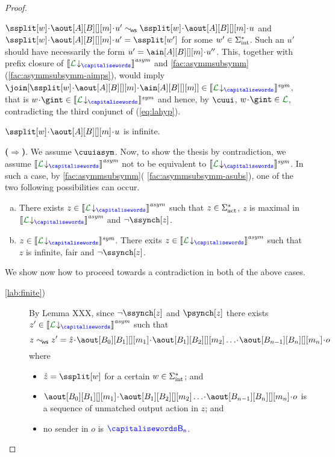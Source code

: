 \begin{proof}
\begin{description}
 $\ssplit[{\acword}]\cat\aout[A][B][][m]\cat u' \commds \ssplit[{\acword}]\cat\aout[A][B][][m]\cat u$ and $\ssplit[{\acword}]\cat\aout[A][B][][m]\cat u' = \ssplit[\acword']$ for some $w'\in\Sigma_{\text{int}}^*$.
Such an $u'$ should have necessarily the form $u'=\ain[A][B][][m]\cat u''$.
 This, together with prefix closure of $\asem{\proj{\clang}{}}$
 and \cref{fac:asymmsubsymm}(\ref{fac:asymmsubsymm-aimps}), would imply
$\join[{\ssplit[{\acword}]\cat\aout[A][B][][m]\cat \ain[A][B][][m]}]\in\ssem{\proj{\clang}{}}$,
that is $\acword\cat\gint\in\ssem{\proj{\clang}{}}$ and hence, by $\cuui$,
$\acword\cat\gint\in{{\clang}}$, contradicting the third conjunct of (\ref{eq:lahyp}).
%
\item
$\ssplit[{\acword}]\cat\aout[A][B][][m]\cat u$ is infinite.\\ 
\end{description}
%
 {\bf ($\Rightarrow$)}.
 We assume $\cuuiasym$. Now, to show the thesis by contradiction, we assume 
 $\asem{\proj{\clang}{}}$ not to be equivalent to $\ssem{\proj{\clang}{}}$.
 In such a case, by \cref{fac:asymmsubsymm}( \ref{fac:asymmsubsymm-asubs}),
 one of the two following possibilities can occur.
 \begin{enumerate}[a)]
 \item
 \label{lab:finite}
 There exists $z\in \asem{\proj{\clang}{}}$ such that $z\in \Sigma_{\text{act}}^*$, $z$ is maximal in 
 $\asem{\proj{\clang}{}}$ and $\neg\ssynch[z]$.
 \item
  \label{lab:infinite}
   $z\in \ssem{\proj{\clang}{}}$.
 There exits $z\in \asem{\proj{\clang}{}}$ such that $z$ is infinite, fair and $\neg\ssynch[z]$.
 \end{enumerate}
 We show now how to proceed towards a contradiction in both of the above cases.
 \begin{description}
 \item[ \ref{lab:finite})]
 By Lemma XXX, since $\neg\ssynch[z]$ and $\psynch[z]$ there exists 
 $z'\in\asem{\proj{\clang}{}}$ such that 
 $$z\commds z' = \hat z \cat\aout[B_0][B_1][][m_1]\cat\aout[B_1][B_2][][m_2]\ldots\cat\aout[B_{n-1}][B_n][][m_n]\cat o$$
  where
  \begin{itemize}
  \item
 $\hat z = \ssplit[\acword]$ for a certain $w\in\Sigma_{\text{int}}^*$; and 
 \item 
 $\aout[B_0][B_1][][m_1]\cat\aout[B_1][B_2][][m_2]\ldots\cat\aout[B_{n-1}][B_n][][m_n]\cat o$ is a sequence
 of unmatched 
 output action in $z$; and
 \item
 no sender in $o$ is $\ptp[B_n]$.

\end{itemize}
\end{description}
\end{proof}

